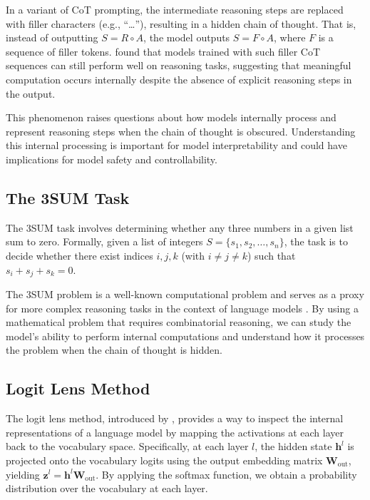 \documentclass{article}
\begin{document}
In a variant of CoT prompting, the intermediate reasoning steps are replaced with filler characters (e.g., ``\ldots''), resulting in a hidden chain of thought. That is, instead of outputting $S = R \circ A$, the model outputs $S = F \circ A$, where $F$ is a sequence of filler tokens. \cite{pfau2023let} found that models trained with such filler CoT sequences can still perform well on reasoning tasks, suggesting that meaningful computation occurs internally despite the absence of explicit reasoning steps in the output.

This phenomenon raises questions about how models internally process and represent reasoning steps when the chain of thought is obscured. Understanding this internal processing is important for model interpretability and could have implications for model safety and controllability.

\subsection{The 3SUM Task}

The 3SUM task involves determining whether any three numbers in a given list sum to zero. Formally, given a list of integers $S = \{s_1, s_2, \dots, s_n\}$, the task is to decide whether there exist indices $i, j, k$ (with $i \ne j \ne k$) such that $s_i + s_j + s_k = 0$.

The 3SUM problem is a well-known computational problem and serves as a proxy for more complex reasoning tasks in the context of language models \cite{pfau2023let}. By using a mathematical problem that requires combinatorial reasoning, we can study the model's ability to perform internal computations and understand how it processes the problem when the chain of thought is hidden.

\subsection{Logit Lens Method}

The logit lens method, introduced by \cite{nostalgebraist2020}, provides a way to inspect the internal representations of a language model by mapping the activations at each layer back to the vocabulary space. Specifically, at each layer $l$, the hidden state $\mathbf{h}^l$ is projected onto the vocabulary logits using the output embedding matrix $\mathbf{W}_{\text{out}}$, yielding $\mathbf{z}^l = \mathbf{h}^l \mathbf{W}_{\text{out}}$. By applying the softmax function, we obtain a probability distribution over the vocabulary at each layer.
\end{document}
